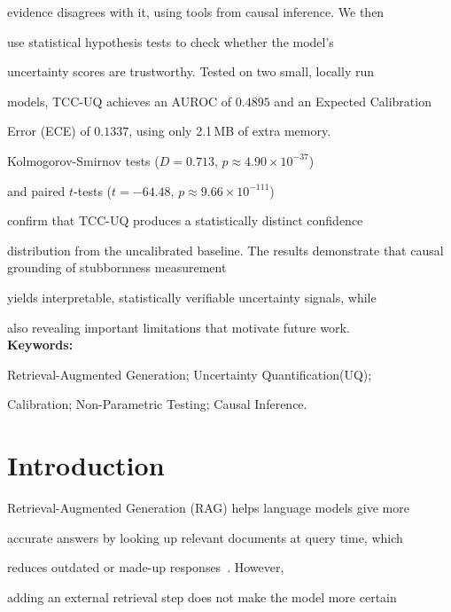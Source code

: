 \documentclass[10pt,twoside]{article}
\numberwithin{equation}{section}
\begin{document}
evidence disagrees with it, using tools from causal inference. We then

use statistical hypothesis tests to check whether the model's

uncertainty scores are trustworthy. Tested on two small, locally run

models, TCC-UQ achieves an AUROC of $0.4895$ and an Expected Calibration

Error (ECE) of $0.1337$, using only 2.1\,MB of extra memory.

Kolmogorov-Smirnov tests ($D = 0.713$, $p \approx 4.90\times10^{-37}$)

and paired $t$-tests ($t = -64.48$, $p \approx 9.66\times10^{-111}$)

confirm that TCC-UQ produces a statistically distinct confidence

distribution from the uncalibrated baseline. The results demonstrate that causal grounding of stubbornness measurement

yields interpretable, statistically verifiable uncertainty signals, while

also revealing important limitations that motivate future work.\\

\noindent\textbf{Keywords:}

Retrieval-Augmented Generation; Uncertainty Quantification(UQ);

Calibration; Non-Parametric Testing; Causal Inference.\\




\section{Introduction}




Retrieval-Augmented Generation (RAG) helps language models give more

accurate answers by looking up relevant documents at query time, which

reduces outdated or made-up responses~\cite{lewis2020retrieval}. However,

adding an external retrieval step does not make the model more certain
\end{document}
